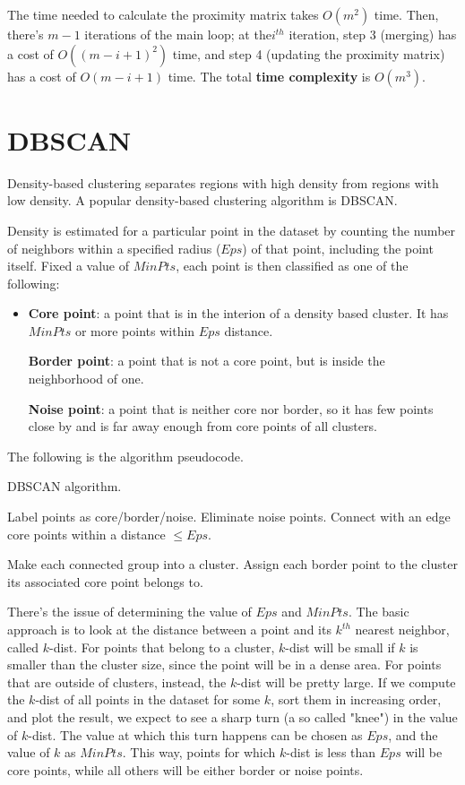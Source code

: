 The time needed to calculate the proximity matrix takes $O(m^2)$ time. Then, there's $m-1$ iterations of the main loop; at the$i^{th}$ iteration, step 3 (merging) has a cost of $O((m-i+1)^2)$ time, and step 4 (updating the proximity matrix) has a cost of $O(m-i+1)$ time. The total \textbf{time complexity} is $O(m^3)$.

\section{DBSCAN}

Density-based clustering separates regions with high density from regions with low density. A popular density-based clustering algorithm is DBSCAN.

Density is estimated for a particular point in the dataset by counting the number of neighbors within a specified radius ($Eps$) of that point, including the point itself. Fixed a value of $MinPts$, each point is then classified as one of the following:

\begin{itemize}
    \item \textbf{Core point}: a point that is in the interion of a density based cluster. It has $MinPts$ or more points within $Eps$ distance.

    \textbf{Border point}: a point that is not a core point, but is inside the neighborhood of one.

    \textbf{Noise point}: a point that is neither core nor border, so it has few points close by and is far away enough from core points of all clusters.
\end{itemize}

The following is the algorithm pseudocode.

\begin{algorithm}
\caption{DBSCAN algorithm.}
\begin{algorithmic}[1]
    \State Label points as core/border/noise.
    \State Eliminate noise points.
    \State Connect with an edge core points within a distance $\leq Eps$.

    \State Make each connected group into a cluster.
    \State Assign each border point to the cluster its associated core point belongs to.
\end{algorithmic}
\end{algorithm}

There's the issue of determining the value of $Eps$ and $MinPts$. The basic approach is to look at the distance between a point and its $k^{th}$ nearest neighbor, called $k$-dist. For points that belong to a cluster, $k$-dist will be small if $k$ is smaller than the cluster size, since the point will be in a dense area. For points that are outside of clusters, instead, the $k$-dist will be pretty large. If we compute the $k$-dist of all points in the dataset for some $k$, sort them in increasing order, and plot the result, we expect to see a sharp turn (a so called "knee") in the value of $k$-dist. The value at which this turn happens can be chosen as $Eps$, and the value of $k$ as $MinPts$. This way, points for which $k$-dist is less than $Eps$ will be core points, while all others will be either border or noise points.

